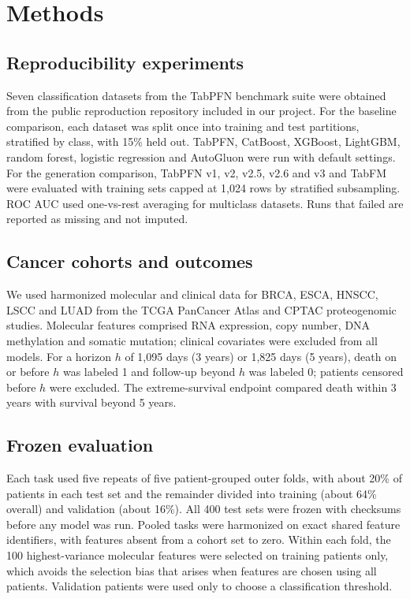 \section*{Methods}

\subsection*{Reproducibility experiments}
Seven classification datasets from the TabPFN benchmark suite were obtained from the public reproduction repository included in our project. For the baseline comparison, each dataset was split once into training and test partitions, stratified by class, with 15\% held out. TabPFN, CatBoost, XGBoost, LightGBM, random forest, logistic regression and AutoGluon were run with default settings. For the generation comparison, TabPFN v1, v2, v2.5, v2.6 and v3 and TabFM were evaluated with training sets capped at 1,024 rows by stratified subsampling. ROC AUC used one-vs-rest averaging for multiclass datasets. Runs that failed are reported as missing and not imputed.

\subsection*{Cancer cohorts and outcomes}
We used harmonized molecular and clinical data for BRCA, ESCA, HNSCC, LSCC and LUAD from the TCGA PanCancer Atlas and CPTAC proteogenomic studies.\citep{tcga2012brca,tcga2017esca,tcga2015hnsc,tcga2012lusc,tcga2014luad,liu2018clinical,li2023pancancer} Molecular features comprised RNA expression, copy number, DNA methylation and somatic mutation; clinical covariates were excluded from all models. For a horizon $h$ of 1,095 days (3 years) or 1,825 days (5 years), death on or before $h$ was labeled 1 and follow-up beyond $h$ was labeled 0; patients censored before $h$ were excluded. The extreme-survival endpoint compared death within 3 years with survival beyond 5 years.

\subsection*{Frozen evaluation}
Each task used five repeats of five patient-grouped outer folds, with about 20\% of patients in each test set and the remainder divided into training (about 64\% overall) and validation (about 16\%). All 400 test sets were frozen with checksums before any model was run. Pooled tasks were harmonized on exact shared feature identifiers, with features absent from a cohort set to zero. Within each fold, the 100 highest-variance molecular features were selected on training patients only, which avoids the selection bias that arises when features are chosen using all patients.\citep{ambroise2002selection} Validation patients were used only to choose a classification threshold.

